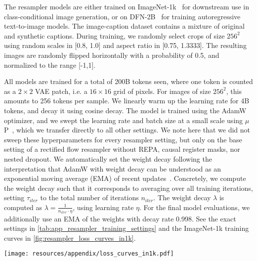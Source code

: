 The resampler models are either trained on ImageNet-1k~\cite{Russakovsky2014ImageNet} for downstream use in class-conditional image generation, or on DFN-2B~\cite{dfn_dataset} for training autoregressive text-to-image models. The image-caption dataset contains a mixture of original and synthetic captions. During training, we randomly select crops of size $256^2$ using random scales in [0.8, 1.0] and aspect ratio in [0.75, 1.3333]. The resulting images are randomly flipped horizontally with a probability of 0.5, and normalized to the range [-1,1].

All models are trained for a total of 200B tokens seen, where one token is counted as a $2 \times 2$ VAE patch, i.e. a $16 \times 16$ grid of pixels. For images of size $256^2$, this amounts to 256 tokens per sample. We linearly warm up the learning rate for 4B tokens, and decay it using cosine decay. The model is trained using the AdamW~\cite{Loshchilov2017AdamW} optimizer, and we swept the learning rate and batch size at a small scale using $\mu$P~\cite{Yang2022muP}, which we transfer directly to all other settings. We note here that we did not sweep these hyperparameters for every resampler setting, but only on the base setting of a rectified flow resampler without REPA, causal register masks, nor nested dropout. We automatically set the weight decay following the interpretation that AdamW with weight decay can be understood as an exponential moving average (EMA) of recent updates~\cite{Wang2024AdamWWDEMA}. Concretely, we compute the weight decay such that it corresponds to averaging over all training iterations, setting $\tau_{iter}$ to the total number of iterations $n_{iter}$. The weight decay $\lambda$ is computed as $\lambda = \frac{1}{n_{iter} \cdot \eta}$, using learning rate $\eta$. For the final model evaluations, we additionally use an EMA of the weights with decay rate 0.998. See the exact settings in \cref{tab:app_resampler_training_settings} and the ImageNet-1k training curves in \cref{fig:resampler_loss_curves_in1k}.



\begin{figure*}[h]
\centering
\texttt{[image: resources/appendix/loss\_curves\_in1k.pdf]}
\caption{
\textbf{\ours training loss curves.} The \ours of different sizes shown here are trained for 200B tokens on ImageNet-1k~\cite{Russakovsky2014ImageNet}. We plot the total loss, i.e. $\mathcal{L}_\text{RF} + \mathcal{L}_\text{REPA}$.
}
\label{fig:resampler_loss_curves_in1k}
\end{figure*}

